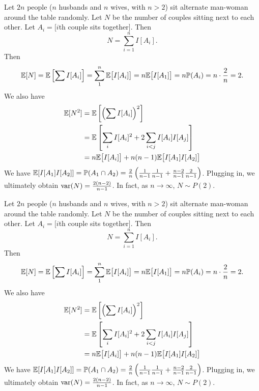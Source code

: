 \begin{note}
  \begin{field}
    \begin{eg}
      Let $2n$ people ($n$ husbands and $n$ wives, with $n > 2$) sit alternate man-woman around the table randomly. Let $N$ be the number of couples sitting next to each other.
      Let $A_i = [i$th couple sits together$]$. Then
      \[
        N = \sum_{i = 1}^n I[A_i].
      \]
      Then
      \[
        \mathbb{E}[N] = \mathbb{E}\left[\sum I[A_i]\right] = \sum_{1}^n \mathbb{E}\big[I[A_i]\big] = n\mathbb{E}\big[I[A_1]\big] = n\mathbb{P}(A_i) = n\cdot \frac{2}{n} = 2.
      \]
      We also have
      \begin{align*}
        \mathbb{E}[N^2] &= \mathbb{E}\left[\left(\sum I[A_i]\right)^2\right]\\
        &= \mathbb{E}\left[\sum_i I[A_i]^2 + 2\sum_{i < j}I[A_i]I[A_j]\right]\\
        &= n\mathbb{E}\big[I[A_i]\big] + n(n - 1)\mathbb{E}\big[I[A_1]I[A_2]\big]
      \end{align*}
      We have $\mathbb{E}[I[A_1]I[A_2]] = \mathbb{P}(A_1\cap A_2) = \frac{2}{n}\left(\frac{1}{n - 1}\frac{1}{n - 1} + \frac{n - 2}{n - 1}\frac{2}{n - 1}\right)$. Plugging in, we ultimately obtain $\operatorname{var}(N) = \frac{2(n- 2)}{n - 1}$.
      In fact, as $n\to \infty$, $N\sim P(2)$.
    \end{eg}
  \end{field}
  \begin{field}
    \begin{eg}
      Let $2n$ people ($n$ husbands and $n$ wives, with $n > 2$) sit alternate man-woman around the table randomly. Let $N$ be the number of couples sitting next to each other.
      Let $A_i = [i$th couple sits together$]$. Then
      \[
        N = \sum_{i = 1}^n I[A_i].
      \]
      Then
      \[
        \mathbb{E}[N] = \mathbb{E}\left[\sum I[A_i]\right] = \sum_{1}^n \mathbb{E}\big[I[A_i]\big] = n\mathbb{E}\big[I[A_1]\big] = n\mathbb{P}(A_i) = n\cdot \frac{2}{n} = 2.
      \]
      We also have
      \begin{align*}
        \mathbb{E}[N^2] &= \mathbb{E}\left[\left(\sum I[A_i]\right)^2\right]\\
        &= \mathbb{E}\left[\sum_i I[A_i]^2 + 2\sum_{i < j}I[A_i]I[A_j]\right]\\
        &= n\mathbb{E}\big[I[A_i]\big] + n(n - 1)\mathbb{E}\big[I[A_1]I[A_2]\big]
      \end{align*}
      We have $\mathbb{E}[I[A_1]I[A_2]] = \mathbb{P}(A_1\cap A_2) = \frac{2}{n}\left(\frac{1}{n - 1}\frac{1}{n - 1} + \frac{n - 2}{n - 1}\frac{2}{n - 1}\right)$. Plugging in, we ultimately obtain $\operatorname{var}(N) = \frac{2(n- 2)}{n - 1}$.
      In fact, as $n\to \infty$, $N\sim P(2)$.
    \end{eg}
  \end{field}
  \xplain{}%
\end{note}

